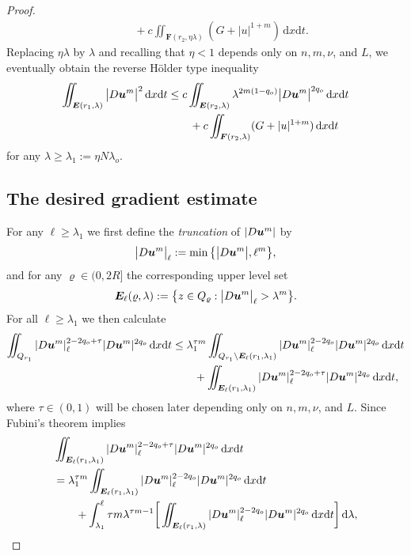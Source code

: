 \documentclass[a4paper, 10pt, american]{amsart}
\numberwithin{theorem}{section}
\numberwithin{equation}{section}
\newcommand{\dxdt}{\,\mathrm{d}x\mathrm{d}t}
\renewcommand{\d}{\,\mathrm{d}}
\renewcommand{\rho}{\varrho}
\newcommand{\power}[2]{\bm{#1^{\mbox{\unboldmath{\scriptsize$#2$}}}}}
\begin{document}
\begin{proof}
\begin{align*}
	&\qquad +
	c\iint_{\boldsymbol F(r_2,\eta\lambda)} (G+|u|^{1+m}) \dxdt.
\end{align*}
Replacing  $\eta\lambda$ by $\lambda$ and recalling that $\eta<1$ depends only on $n,m,\nu$, and $L$, we eventually obtain the reverse H\"older type inequality
\begin{align}\label{pre-1}
	\iint_{\boldsymbol E(r_1,\lambda)} 
	\big|D\power{u}{m}\big|^2 \dxdt
	&\le
	c\iint_{\boldsymbol E(r_2,\lambda)} 
	\lambda^{2m(1-q_o)}\big|D\power{u}{m}\big|^{2q_o} \dxdt  \nonumber\\
	&\qquad+
	c \iint_{\boldsymbol F(r_2,\lambda)} (G+|u|^{1+m}) \dxdt
\end{align}
for any $\lambda\ge \lambda_1:= \eta N\lambda_o$.




\subsection{The desired gradient estimate}
For any $\ell\ge \lambda_1$ we first define 
the {\it truncation} of $|D\power{u}{m}|$ by
$$
	\big|D\power{u}{m}\big|_\ell
	:=
	\min\big\{\big|D\power{u}{m}\big|, \ell^m\big\},
$$
and for any $\rho\in(0,2R]$ the corresponding upper level set
$$
	\boldsymbol E_\ell(\rho,\lambda)
	:=
	\big\{z\in Q_\rho: \big|D\power{u}{m}\big|_\ell>\lambda^{m}\big\}.
$$
For all $\ell\ge\lambda_1$ we then calculate 
\begin{align}\label{est-1}
\iint_{Q_{r_1}}|D\power um|_\ell^{2-2q_o+\tau}|D\power um|^{2q_o}\dxdt
&\le
\lambda_1^{\tau m}\iint_{Q_{r_1}\setminus \boldsymbol E_\ell(r_1,\lambda_1)} |D\power um|_\ell^{2-2q_o}|D\power um|^{2q_o}\dxdt\nonumber\\
&\qquad+
\iint_{\boldsymbol E_\ell(r_1,\lambda_1)}|D\power um|_\ell^{2-2q_o+\tau}|D\power um|^{2q_o}\dxdt,
\end{align}
where $\tau\in(0,1)$ will be chosen later depending only on $n,m,\nu$, and $L$.
Since Fubini's theorem implies 
\begin{align}
&\iint_{\boldsymbol E_\ell(r_1,\lambda_1)}|D\power um|_\ell^{2-2q_o+\tau}|D\power um|^{2q_o}\dxdt\nonumber\\
&=
\lambda_1^{\tau m}\iint_{\boldsymbol E_\ell(r_1,\lambda_1)}|D\power um|_\ell^{2-2q_o}|D\power um|^{2q_o}\dxdt\nonumber\\
&\qquad+
\int_{\lambda_1}^\ell \tau m \lambda^{\tau m-1}\bigg[\iint_{\boldsymbol E_\ell(r_1,\lambda)}|D\power um|_\ell^{2-2q_o}|D\power um|^{2q_o}\dxdt\bigg]\d\lambda,\nonumber
\end{align}

\end{proof}
\end{document}
